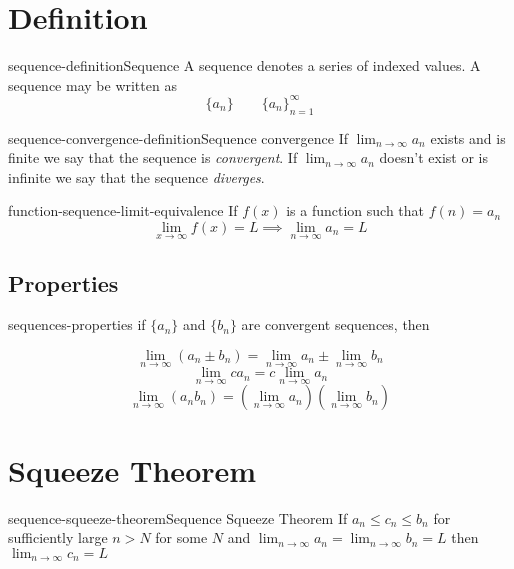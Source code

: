 \documentclass[preview]{standalone}
\begin{document}
\genpage

\section{Definition}

\begin{snippetdefinition}{sequence-definition}{Sequence}
    A sequence denotes a series of indexed values.
    A sequence may be written as
    \[
        \{a_n\} \quad \quad {\{a_n\}}_{n=1}^\infty
    \]
\end{snippetdefinition}

\begin{snippetdefinition}{sequence-convergence-definition}{Sequence convergence}
    If \(\lim_{n \to \infty}a_n\) exists and is finite
    we say that the sequence is \textit{convergent}. If 
    \(\lim_{n \to \infty}a_n\) doesn't exist or is infinite
    we say that the sequence \textit{diverges}.
\end{snippetdefinition}

\begin{snippetcorollary}{function-sequence-limit-equivalence}{}
    If \(f(x)\) is a function such that \(f(n)=a_n\)
    \[
        \lim_{x\to\infty}f(x)=L \implies
        \lim_{n\to\infty}a_n=L
    \]
\end{snippetcorollary}

\subsection{Properties}

\begin{snippet}{sequences-properties}
    if \(\{a_n\}\) and \(\{b_n\}\) are convergent sequences, then

    \[
        \lim_{n\to\infty} (a_n \pm b_n) = \lim_{n\to\infty} a_n \pm
        \lim_{n\to\infty} b_n
    \]
    \[
        \lim_{n\to\infty} ca_n = c \lim_{n\to\infty} a_n
    \]
    \[
        \lim_{n\to\infty} (a_n b_n) =
        \left(\lim_{n\to\infty} a_n\right)
        \left(\lim_{n\to\infty} b_n\right)
    \]
\end{snippet}

\section{Squeeze Theorem}

\begin{snippettheorem}{sequence-squeeze-theorem}{Sequence Squeeze Theorem}
    If \(a_n \leq c_n \leq b_n\) for sufficiently large \(n>N\) for some \(N\)
    and \(\lim_{n\to\infty}a_n =\lim_{n\to\infty}b_n=L\)
    then \(\lim_{n\to\infty} c_n =L\)
\end{snippettheorem}
\end{document}
